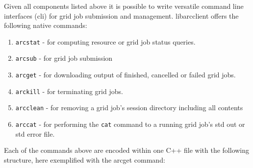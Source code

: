 \documentclass{book}
\newcommand{\arclib}{libarcclient}
\begin{document}
Given all components listed above it is possible to write versatile
command line interfaces (cli) for grid job submission and
management. {\arclib} offers the following native commands:

\begin{enumerate}
\item{\texttt{arcstat} - for computing resource or grid job status
  queries.}
\item{\texttt{arcsub} - for grid job submission}
\item{\texttt{arcget} - for downloading output of finished, cancelled
  or failed grid jobs.}
\item{\texttt{arckill} - for terminating grid jobs.}
\item{\texttt{arcclean} - for removing a grid job's session directory
  including all contents}
\item{\texttt{arccat} - for performing the \texttt{cat} command to a
  running grid job's std out or std error file.}
\end{enumerate}

Each of the commands above are encoded within one C++ file with the
following structure, here exemplified with the arcget command:
\end{document}
